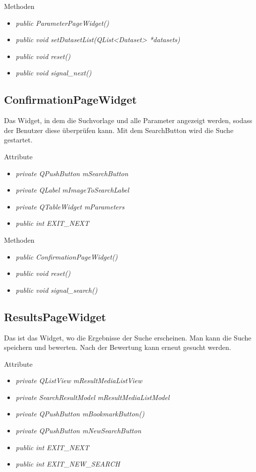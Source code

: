 Methoden
\begin{itemize}
	\item\textit{public ParameterPageWidget()}
	\item\textit{public void setDatasetList(QList<Dataset> *datasets)}
	\item\textit{public void reset()}
	\item\textit{public void signal\_next()}
\end{itemize}

\subsection*{ConfirmationPageWidget}
Das Widget, in dem die Suchvorlage und alle Parameter angezeigt werden, sodass der Benutzer diese überprüfen kann. Mit dem SearchButton wird die Suche gestartet.

Attribute
\begin{itemize}
	\item\textit{private QPushButton mSearchButton}
	\item\textit{private QLabel mImageToSearchLabel}
	\item\textit{private QTableWidget mParameters}
	\item\textit{public int EXIT\_NEXT}     
\end{itemize}

Methoden
\begin{itemize}
	\item\textit{public ConfirmationPageWidget()}
	\item\textit{public void reset()}
	\item\textit{public void signal\_search()}
\end{itemize}

\subsection*{ResultsPageWidget}
Das ist das Widget, wo die Ergebnisse der Suche erscheinen. Man kann die Suche speichern und bewerten. Nach der Bewertung kann erneut gesucht werden.

Attribute
\begin{itemize}
	\item\textit{private QListView mResultMediaListView}
	\item\textit{private SearchResultModel mResultMediaListModel}
	\item\textit{private QPushButton mBookmarkButton()}
	\item\textit{private QPushButton mNewSearchButton}
	\item\textit{public int EXIT\_NEXT}  
	\item\textit{public int EXIT\_NEW_SEARCH}  
\end{itemize}

